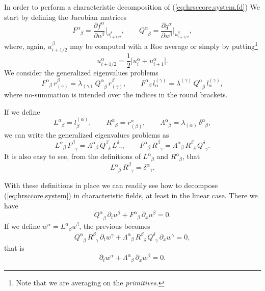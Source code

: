 In order to perform a characteristic decomposition of
(\ref{eq:hrsccore.system.fd}) We start by defining the Jacobian matrices
\[
  F^{\alpha}_{\phantom{\alpha}\beta} = \frac{\partial f^\alpha}{\partial
  u^\beta}\bigg|_{u_{i+1/2}^\beta}, \qquad Q^{\alpha}_{\phantom{\alpha}\beta} =
  \frac{\partial q^\alpha}{\partial u^\beta}\bigg|_{u_{i+1/2}^\beta},
\]
where, again, $u_{i+1/2}^\beta$ may be computed with a Roe average or simply by
putting\footnote{Note that we are averaging on the \emph{primitives}.}
\[
  u_{i+1/2}^\alpha = \frac{1}{2} \big[ u_i^\alpha + u_{i+1}^\alpha \big].
\]
We consider the generalized eigenvalues problems
\[
  F^\alpha_{\phantom{\alpha}\beta}\, r_{(\gamma)}^\beta = \lambda_{(\gamma)}\,
  Q^\alpha_{\phantom{\alpha}\beta}\, r_{(\gamma)}^\beta,
  \qquad
  F^\alpha_{\phantom{\alpha}\beta}\, l^{(\gamma)}_\alpha = \lambda^{(\gamma)}\,
  Q^\alpha_{\phantom{\alpha}\beta}\, l^{(\gamma)}_\alpha,
\]
where no-summation is intended over the indices in the round brackets.

If we define
\[
  L^\alpha_{\phantom{\alpha}\beta} = l_\beta^{(\alpha)}, \qquad
  R^\alpha_{\phantom{\alpha}\beta} = r^\alpha_{(\beta)}, \qquad
  \Lambda^\alpha_{\phantom{\alpha}\beta} = \lambda_{(\alpha)}\,
  \delta^\alpha_{\phantom{\alpha}\beta},
\]
we can write the generalized eigenvalues problems as
\begin{equation}\label{eq:hrsccore.eigproblem}
  L^\alpha_{\phantom{\alpha}\beta}\, F^\beta_{\phantom{\beta}\gamma} =
  \Lambda^\alpha_{\phantom{\alpha}\beta}\, Q^\beta_{\phantom{\beta}\delta}\,
  L^\delta_{\phantom{\delta}\gamma}, \qquad
  F^\alpha_{\phantom{\alpha}\beta}\, R^\beta_{\phantom{\beta}\gamma} =
  \Lambda^\alpha_{\phantom{\alpha}\beta}\, R^\beta_{\phantom{\beta}\delta}\,
  Q^\delta_{\phantom{\delta}\gamma}.
\end{equation}
It is also easy to see, from the definitions of $L^\alpha_{\phantom{\alpha}
\beta}$ and $R^\alpha_{\phantom{\alpha} \beta}$, that
\[
  L^\alpha_{\phantom{\alpha}\beta}\, R^\beta_{\phantom{\beta}\gamma} =
  \delta^\alpha_{\phantom{\alpha}\gamma}.
\]

With these definitions in place we can readily see how to decompose
(\ref{eq:hrsccore.system}) in characteristic fields, at least in the linear
case. There we have
\[
  Q^\alpha_{\phantom{\alpha}\beta}\, \partial_t u^\beta +
  F^\alpha_{\phantom{\alpha}\beta}\, \partial_x u^\beta = 0.
\]
If we define $w^\alpha = L^\alpha_{\phantom{\alpha}\beta} u^\beta$, the previous
becomes
\[
  Q^\alpha_{\phantom{\alpha}\beta}\, R^\beta_{\phantom{\beta} \gamma}\,
  \partial_t w^\gamma + \Lambda^\alpha_{\phantom{\alpha} \beta}\,
  R^\beta_{\phantom{\beta} \delta}\, Q^\delta_{\phantom{\delta} \gamma}\,
  \partial_x w^\gamma = 0,
\]
that is
\begin{equation}\label{eq:hrsccore.system.characteristics}
  \partial_t w^\alpha + \Lambda^{\alpha}_{\phantom{\alpha}\beta}\, \partial_x
  w^\beta = 0.
\end{equation}

